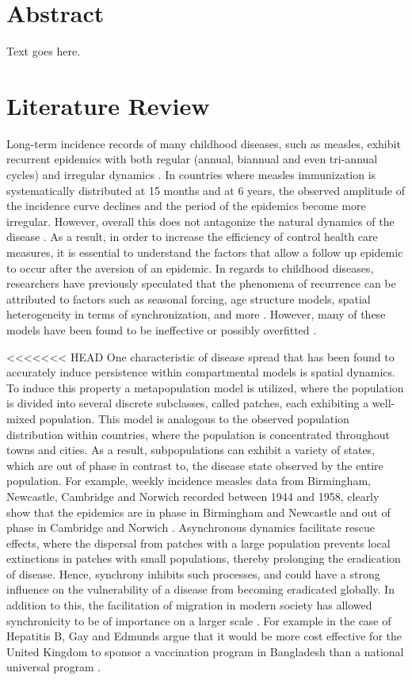 \documentclass[twocolumn,nofootinbib,showkeys,twoside,floatfix,unsortedaddress,flushbottom,10pt,aps,pra]{report}
\begin{document}
% 

\twocolumn

\section{Abstract} Text goes here.
\section{Literature Review }
Long-term incidence records of many childhood diseases, such as measles, exhibit recurrent epidemics with both regular (annual, biannual and even tri-annual cycles) and irregular dynamics \cite{Earn2000}. In countries where measles immunization is systematically distributed at 15 months and at 6 years, the observed amplitude of the incidence curve declines and the period of the epidemics become more irregular. However, overall this does not antagonize the natural dynamics of the disease \cite{Samanta2014,Earn2000}. As a result, in order to increase the efficiency of control health care measures, it is essential to understand the factors that allow a follow up epidemic to occur after the aversion of an epidemic. In regards to childhood diseases, researchers have previously speculated that the phenomena of recurrence can be attributed to factors such as seasonal forcing, age structure models, spatial heterogeneity in terms of synchronization, and more \cite{Lloyd1996}. However, many of these models have been found to be ineffective or possibly overfitted \cite{Lloyd1996}. 
\par
\smallskip \qquad
<<<<<<< HEAD
One characteristic of disease spread that has been found to accurately induce persistence within compartmental models is spatial dynamics. To induce this property a metapopulation model is utilized, where the population is divided into several discrete subclasses, called patches, each exhibiting a well-mixed population. This model is analogous to the observed population distribution within countries, where the population is concentrated throughout towns and cities. As a result, subpopulations can exhibit a variety of states, which are out of phase in contrast to, the disease state observed by the entire population. For example, weekly incidence measles data from Birmingham, Newcastle, Cambridge and Norwich recorded between 1944 and 1958, clearly show that the epidemics are in phase in Birmingham and Newcastle and out of phase in Cambridge and Norwich \cite{Grenfell2001}. Asynchronous dynamics facilitate rescue effects, where the dispersal from patches with a large population prevents local extinctions in patches with small populations, thereby prolonging the eradication of disease. Hence, synchrony inhibits such processes, and could have a strong influence on the vulnerability of a disease from becoming eradicated globally. In addition to this, the facilitation of migration in modern society has allowed synchronicity to be of importance on a larger scale \cite{McCluskey2011}. For example in the case of Hepatitis B, Gay and Edmunds argue that it would be more cost effective for the United Kingdom to sponsor a vaccination program in Bangladesh than a national universal program \cite{Burton2012}. 
\end{document}
